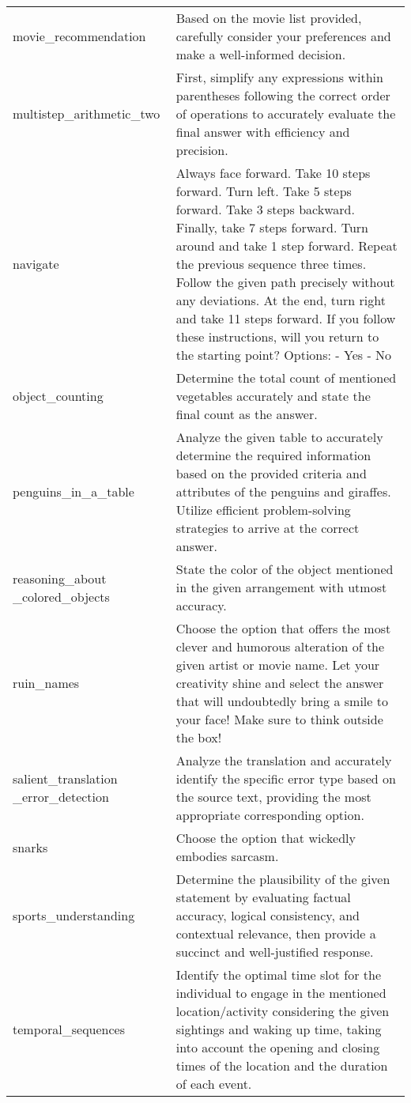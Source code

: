 \begin{table}[H]
\begin{center}
\begin{tabular}{P{2.3cm}P{11.6cm}}
movie\_recommendation & Based on the movie list provided, carefully consider your preferences and make a well-informed decision. \\ [2ex]
multistep\_arithmetic\_two & First, simplify any expressions within parentheses following the correct order of operations to accurately evaluate the final answer with efficiency and precision. \\ [2ex]
navigate & Always face forward. Take 10 steps forward. Turn left. Take 5 steps forward. Take 3 steps backward. Finally, take 7 steps forward. Turn around and take 1 step forward. Repeat the previous sequence three times. Follow the given path precisely without any deviations. At the end, turn right and take 11 steps forward. If you follow these instructions, will you return to the starting point?
Options:
- Yes
- No \\ [2ex]
object\_counting & Determine the total count of mentioned vegetables accurately and state the final count as the answer. \\ [2ex]
penguins\_in\_a\_table & Analyze the given table to accurately determine the required information based on the provided criteria and attributes of the penguins and giraffes. Utilize efficient problem-solving strategies to arrive at the correct answer. \\ [2ex]
reasoning\_about \_colored\_objects & State the color of the object mentioned in the given arrangement with utmost accuracy. \\ [2ex]
ruin\_names & Choose the option that offers the most clever and humorous alteration of the given artist or movie name. Let your creativity shine and select the answer that will undoubtedly bring a smile to your face! Make sure to think outside the box! \\ [2ex]
salient\_translation \_error\_detection & Analyze the translation and accurately identify the specific error type based on the source text, providing the most appropriate corresponding option. \\ [2ex]
snarks & Choose the option that wickedly embodies sarcasm. \\ [2ex]
sports\_understanding & Determine the plausibility of the given statement by evaluating factual accuracy, logical consistency, and contextual relevance, then provide a succinct and well-justified response. \\ [2ex]
temporal\_sequences & Identify the optimal time slot for the individual to engage in the mentioned location/activity considering the given sightings and waking up time, taking into account the opening and closing times of the location and the duration of each event. \\ [2ex]

\end{tabular}
\end{center}
\end{table}
